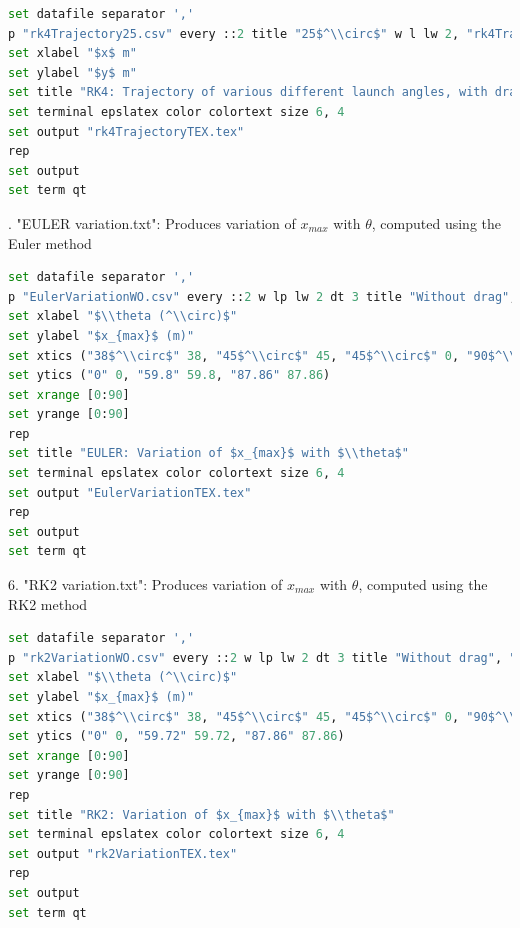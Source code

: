 \documentclass[12pt]{article}
\begin{document}
\begin{lstlisting}[language=Python, caption="RK2 trajectory.txt"]
set datafile separator ','
p "rk4Trajectory25.csv" every ::2 title "25$^\\circ$" w l lw 2, "rk4Trajectory30.csv" every ::2 title "30$^\\circ$" w l lw 2,"rk4Trajectory38.csv" every ::2 title "38$^\\circ$" w l lw 2, "rk4Trajectory45.csv" every ::2 title "45$^\\circ$" w l lw 2,"rk4Trajectory50.csv" every ::2 title "50$^\\circ$" w l lw 2
set xlabel "$x$ m"
set ylabel "$y$ m"
set title "RK4: Trajectory of various different launch angles, with drag"
set terminal epslatex color colortext size 6, 4
set output "rk4TrajectoryTEX.tex"
rep
set output
set term qt
\end{lstlisting}
. "EULER variation.txt": Produces variation of $x_{max}$ with $\theta$, computed using the Euler method
\begin{lstlisting}[language=Python, caption="EULER variation.txt"]
set datafile separator ','
p "EulerVariationWO.csv" every ::2 w lp lw 2 dt 3 title "Without drag", "EulerVariationW.csv" every ::2 w lp lw 2 title "With drag"
set xlabel "$\\theta (^\\circ)$"
set ylabel "$x_{max}$ (m)"
set xtics ("38$^\\circ$" 38, "45$^\\circ$" 45, "45$^\\circ$" 0, "90$^\\circ$" 90, "0$^\\circ$" 0)
set ytics ("0" 0, "59.8" 59.8, "87.86" 87.86)
set xrange [0:90]
set yrange [0:90]
rep
set title "EULER: Variation of $x_{max}$ with $\\theta$"
set terminal epslatex color colortext size 6, 4
set output "EulerVariationTEX.tex"
rep
set output
set term qt 
\end{lstlisting}
6. "RK2 variation.txt": Produces variation of $x_{max}$ with $\theta$, computed using the RK2 method
\begin{lstlisting}[language=Python, caption="RK2 variation.txt"]
set datafile separator ','
p "rk2VariationWO.csv" every ::2 w lp lw 2 dt 3 title "Without drag", "rk2VariationW.csv" every ::2 w lp lw 2 title "With drag"
set xlabel "$\\theta (^\\circ)$"
set ylabel "$x_{max}$ (m)"
set xtics ("38$^\\circ$" 38, "45$^\\circ$" 45, "45$^\\circ$" 0, "90$^\\circ$" 90, "0$^\\circ$" 0)
set ytics ("0" 0, "59.72" 59.72, "87.86" 87.86)
set xrange [0:90]
set yrange [0:90]
rep
set title "RK2: Variation of $x_{max}$ with $\\theta$"
set terminal epslatex color colortext size 6, 4
set output "rk2VariationTEX.tex"
rep
set output
set term qt 
\end{lstlisting}
\end{document}
